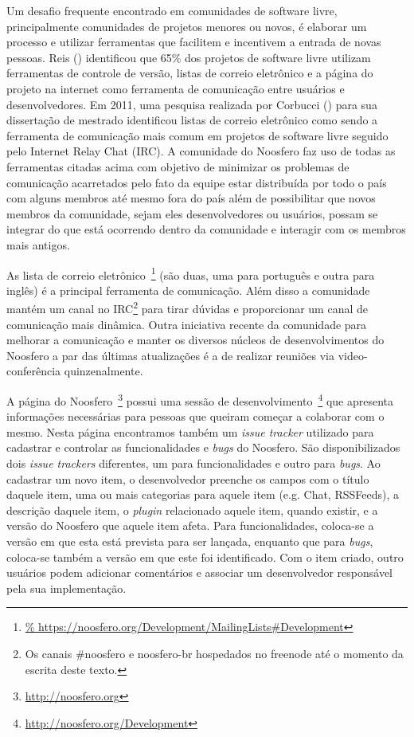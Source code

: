 Um desafio frequente encontrado em comunidades de software livre, principalmente
comunidades de projetos menores ou novos, é elaborar um processo e utilizar
ferramentas que facilitem e incentivem a entrada de novas pessoas. Reis (\citeyear{reis2003})
identificou que 65\% dos projetos de software livre utilizam
ferramentas de controle de versão, listas de correio eletrônico e a página do
projeto na internet como ferramenta de comunicação entre usuários e
desenvolvedores. Em 2011, uma pesquisa realizada por Corbucci (\citeyear{corbucci2011})
para sua dissertação de mestrado identificou listas de correio eletrônico como
sendo a ferramenta de comunicação mais comum em projetos de software livre
seguido pelo Internet Relay Chat (IRC).
%
A comunidade do Noosfero faz uso de todas as ferramentas citadas acima com
objetivo de minimizar  os problemas de comunicação acarretados pelo fato da
equipe estar distribuída por todo o país com alguns membros até mesmo fora do
país além de possibilitar que novos membros da comunidade, sejam eles
desenvolvedores ou usuários, possam se integrar do que está ocorrendo dentro da
comunidade e interagir com os membros mais antigos.

As lista de correio eletrônico~\footnote{\url{%
https://noosfero.org/Development/MailingLists#Development}} (são duas, uma para
português e outra para inglês) é a principal ferramenta de comunicação. 
%
Além disso a comunidade mantém um canal no IRC\footnote{Os canais #noosfero e
noosfero-br hospedados no freenode até o momento da escrita deste texto.}
para tirar dúvidas e proporcionar um canal de comunicação mais dinâmica.
%
Outra iniciativa recente da comunidade para melhorar a comunicação e manter os
diversos núcleos de desenvolvimentos do Noosfero a par das últimas atualizações
é a de realizar reuniões via video-conferência quinzenalmente.

A página do Noosfero~\footnote{\url{http://noosfero.org}} possui uma sessão de
desenvolvimento~\footnote{\url{http://noosfero.org/Development}} que apresenta
informações necessárias para pessoas que queiram começar a colaborar com o
mesmo. Nesta página encontramos também um \textit{issue tracker} utilizado para
cadastrar e controlar as funcionalidades e \textit{bugs} do Noosfero.
%
São disponibilizados dois \textit{issue trackers} diferentes, um para
funcionalidades e outro para \textit{bugs}. Ao cadastrar um novo item, o
desenvolvedor preenche os campos com o título daquele item, uma ou mais
categorias para aquele item (e.g. Chat, RSSFeeds), a descrição daquele
item, o \textit{plugin} relacionado aquele item, quando existir, e a
versão do Noosfero que aquele item afeta.
%
Para funcionalidades, coloca-se a
versão em que esta está prevista para ser lançada, enquanto que para
\textit{bugs}, coloca-se também a versão em que este foi identificado. Com o
item criado, outro usuários podem adicionar comentários e associar um
desenvolvedor responsável pela sua implementação.


